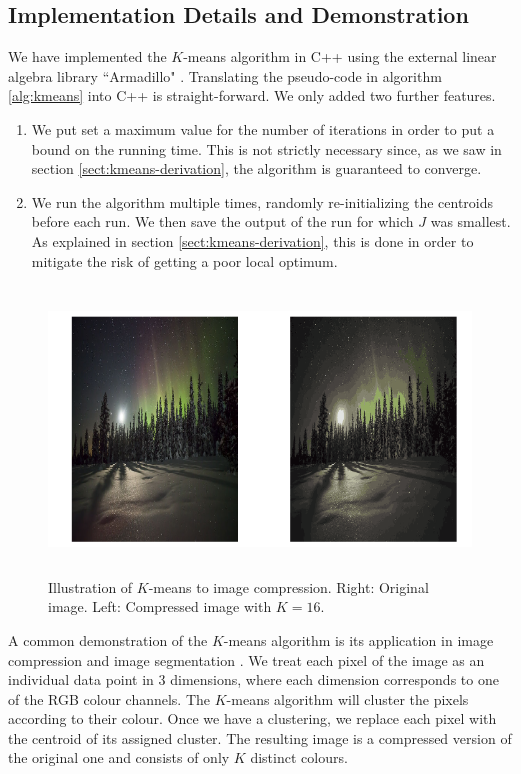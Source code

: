 \documentclass[final,3p,times,twocolumn]{elsarticle}
\begin{document}
\subsection{Implementation Details and Demonstration}
\label{sect:kmeans-code}
We have implemented the $K$-means algorithm in C++ using the external linear algebra library ``Armadillo" \cite{armadillo}.
Translating the pseudo-code in algorithm \ref{alg:kmeans} into C++ is straight-forward.
We only added two further features.
\begin{enumerate}
\item We put set a maximum value for the number of iterations in order to put a bound on the running time.
This is not strictly necessary since, as we saw in section \ref{sect:kmeans-derivation}, the algorithm is guaranteed to converge.
\item We run the algorithm multiple times, randomly re-initializing the centroids before each run.
We then save the output of the run for which $J$ was smallest.
As explained in section \ref{sect:kmeans-derivation}, this is done in order to mitigate the risk of getting a poor local optimum.
\end{enumerate}

\begin{figure}
\centering
\includegraphics[width=\textwidth,height=3in]{polar.png}
\caption{Illustration of $K$-means to image compression. Right: Original image. Left: Compressed image with $K=16$.}
\label{fig:kmeans-image}
\end{figure}

A common demonstration of the $K$-means algorithm is its application in image compression and image segmentation \cite{forsyth2002}.
We treat each pixel of the image as an individual data point in 3 dimensions, where each dimension corresponds to one of the RGB colour channels.
The $K$-means algorithm will cluster the pixels according to their colour.
Once we have a clustering, we replace each pixel with the centroid of its assigned cluster.
The resulting image is a compressed version of the original one and consists of only $K$ distinct colours.
\end{document}
